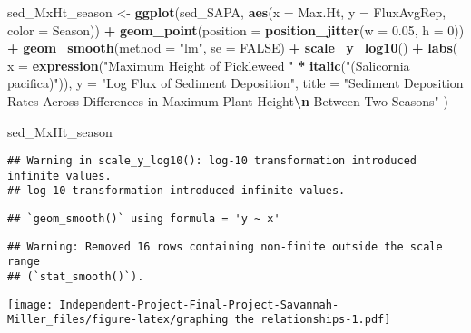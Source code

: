 \documentclass[
]{article}
\newenvironment{Shaded}{\begin{snugshade}}{\end{snugshade}}
\newcommand{\AttributeTok}[1]{\textcolor[rgb]{0.13,0.29,0.53}{#1}}
\newcommand{\ConstantTok}[1]{\textcolor[rgb]{0.56,0.35,0.01}{#1}}
\newcommand{\DecValTok}[1]{\textcolor[rgb]{0.00,0.00,0.81}{#1}}
\newcommand{\FloatTok}[1]{\textcolor[rgb]{0.00,0.00,0.81}{#1}}
\newcommand{\FunctionTok}[1]{\textcolor[rgb]{0.13,0.29,0.53}{\textbf{#1}}}
\newcommand{\NormalTok}[1]{#1}
\newcommand{\OtherTok}[1]{\textcolor[rgb]{0.56,0.35,0.01}{#1}}
\newcommand{\SpecialCharTok}[1]{\textcolor[rgb]{0.81,0.36,0.00}{\textbf{#1}}}
\newcommand{\StringTok}[1]{\textcolor[rgb]{0.31,0.60,0.02}{#1}}
\begin{document}
\begin{Shaded}
\begin{Highlighting}[]
\NormalTok{sed\_MxHt\_season }\OtherTok{\textless{}{-}} \FunctionTok{ggplot}\NormalTok{(sed\_SAPA, }\FunctionTok{aes}\NormalTok{(}\AttributeTok{x =}\NormalTok{ Max.Ht, }\AttributeTok{y =}\NormalTok{ FluxAvgRep, }\AttributeTok{color =}\NormalTok{ Season)) }\SpecialCharTok{+}
  \FunctionTok{geom\_point}\NormalTok{(}\AttributeTok{position =} \FunctionTok{position\_jitter}\NormalTok{(}\AttributeTok{w =} \FloatTok{0.05}\NormalTok{, }\AttributeTok{h =} \DecValTok{0}\NormalTok{)) }\SpecialCharTok{+}
  \FunctionTok{geom\_smooth}\NormalTok{(}\AttributeTok{method =} \StringTok{"lm"}\NormalTok{, }\AttributeTok{se =} \ConstantTok{FALSE}\NormalTok{) }\SpecialCharTok{+}
  \FunctionTok{scale\_y\_log10}\NormalTok{() }\SpecialCharTok{+}
  \FunctionTok{labs}\NormalTok{(}
    \AttributeTok{x =} \FunctionTok{expression}\NormalTok{(}\StringTok{"Maximum Height of Pickleweed "} \SpecialCharTok{*} \FunctionTok{italic}\NormalTok{(}\StringTok{"(Salicornia pacifica)"}\NormalTok{)),}
    \AttributeTok{y =} \StringTok{"Log Flux of Sediment Deposition"}\NormalTok{,}
    \AttributeTok{title =} \StringTok{"Sediment Deposition Rates Across Differences in Maximum Plant Height}\SpecialCharTok{\textbackslash{}n}\StringTok{ Between Two Seasons"}
\NormalTok{  )}

\NormalTok{sed\_MxHt\_season}
\end{Highlighting}
\end{Shaded}

\begin{verbatim}
## Warning in scale_y_log10(): log-10 transformation introduced infinite values.
## log-10 transformation introduced infinite values.
\end{verbatim}

\begin{verbatim}
## `geom_smooth()` using formula = 'y ~ x'
\end{verbatim}

\begin{verbatim}
## Warning: Removed 16 rows containing non-finite outside the scale range
## (`stat_smooth()`).
\end{verbatim}

\texttt{[image: Independent-Project-Final-Project-Savannah-Miller\_files/figure-latex/graphing the relationships-1.pdf]}
\end{document}

